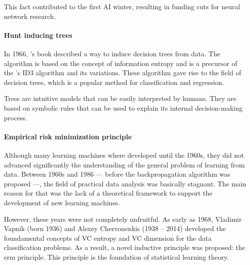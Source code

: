 This fact contributed to the first AI winter, resulting in funding cuts for neural
network research.

\paragraph{Hunt inducing trees}

In 1966, \citeauthor{Hunt1966}'s book described a way to induce decision trees from
data.  The algorithm is based on the concept of information entropy and is a precursor of
the \citeauthor{Quinlan1986}'s ID3 algorithm and its variations.
These algorithm gave rise to the field of decision trees, which is a popular method for
classification and regression.

Trees are intuitive models that can be easily interpreted by humans.  They are based on
symbolic rules that can be used to explain its internal decision-making process.


\paragraph{Empirical risk minimization principle}

Although many learning machines where developed until the 1960s, they did not advanced
significantly the understanding of the general problem of learning from data.  Between
1960s and 1986 --- before the backpropagation algorithm was proposed ---, the field of practical
data analysis was basically stagnant.  The main reason for that was the lack of a
theoretical framework to support the development of new learning machines.

However, these years were not completely unfruitful.  As early as 1968, Vladimir Vapnik
(born 1936)
and Alexey Chervonenkis (1938 -- 2014) developed the foundamental concepts of VC entropy
and VC dimension for the data classification problems.  As a result, a novel inductive
principle was proposed: the \gls{erm} principle.
This principle is the foundation of statistical learning theory.

%

